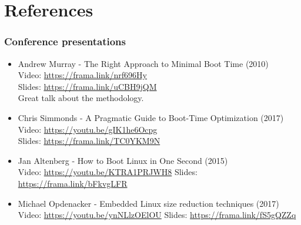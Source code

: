 \section{References}

\begin{frame}
\frametitle{Conference presentations}
\begin{itemize}
\item Andrew Murray - The Right Approach to Minimal Boot Time (2010) \\
      Video: \url{https://frama.link/nrf696Hy}\\
      Slides: \url{https://frama.link/uCBH9jQM} \\
      Great talk about the methodology.
\item Chris Simmonds - A Pragmatic Guide to Boot-Time Optimization (2017)\\
      Video: \url{https://youtu.be/gIK1he6Ocpg}\\
      Slides: \url{https://frama.link/TC0YKM9N}
\item Jan Altenberg - How to Boot Linux in One Second (2015)\\
      Video: \url{https://youtu.be/KTRA1PRJWH8}
      Slides: \url{https://frama.link/bFkvgLFR}
\item Michael Opdenacker - Embedded Linux size reduction techniques (2017)
      Video: \url{https://youtu.be/ynNLlzOElOU}
      Slides: \url{https://frama.link/fS5gQZZq}
\end{itemize}
\end{frame}
